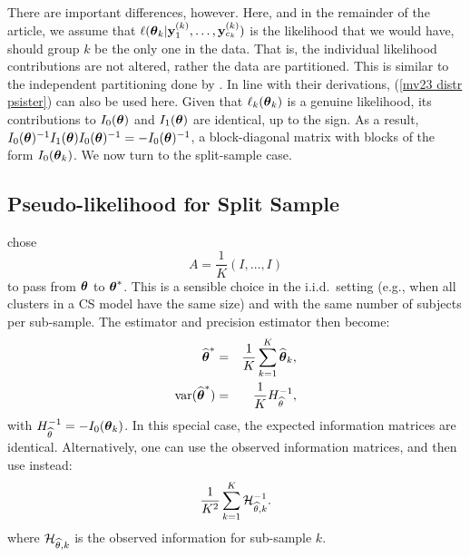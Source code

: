 \documentclass[11pt,a5paper,twoside]{book}
\newcommand{\bftheta}{\mbox{\boldmath $\theta$}}
\newcommand{\by}{{\bf y}}
\begin{document}
{\begin{sloppypar}
There are important differences, however. Here, and in the remainder 
of the article, we assume that
$\ell(\bftheta_k|\by_1^{(k)},\dots,\by_{c_k}^{(k)})$ is the likelihood 
that we would have, should group $k$ be the only one in the data. 
That is, the individual likelihood contributions are not altered, 
rather the data are partitioned. This is similar to the independent 
partitioning done by \cite{Iddi2011}. In line with their derivations, 
(\ref{mv23 distr psister}) can also be used here. Given that 
$\ell_k(\bftheta_k)$ is a genuine likelihood, its contributions 
to $I_0(\bftheta)$ and $I_1(\bftheta)$ are identical, up to the sign. 
As a result, $I_0(\bftheta)^{-1}I_1(\bftheta)I_0(\bftheta)^{-1}=-I_0(\bftheta)^{-1}$, 
a block-diagonal matrix with blocks of the form $I_0(\bftheta_k)$. We now turn to the split-sample case.
\end{sloppypar}



\subsection{Pseudo-likelihood for Split Sample }
\label{appC}


{\cite{Iddi2011}  chose
\begin{equation}
\label{amtrix}
A=\frac{1}{K}(I,\dots,I)
\end{equation}
to pass from $\bftheta$ to $\bftheta^\ast$. This is a sensible choice in the 
i.i.d.\ setting (e.g., when all clusters in a CS model have the same size) 
and with the same number of subjects per sub-sample. The estimator and 
precision estimator then become:
\begin{eqnarray}
\label{schatterindep}
\widehat{\bftheta}^*&=&\frac{1}{K}\sum_{k=1}^K\widehat{\bftheta}_k,\\
\label{asymptoticvarianceexpected}
\mbox{var}(\widehat{\bftheta}^*)&=&\frac{1}{K}H_{\widehat{\theta}}^{-1},
\end{eqnarray}
with $H_{\widehat{\theta}}^{-1}=-I_0(\bftheta_k)$. In this special case, 
the expected information matrices are identical. Alternatively, 
one can use the observed information matrices, and then use instead:
\begin{equation}
\label{asymptoticvarianceobserved}
\frac{1}{K^2}\sum_{k=1}^K{\cal H}_{\widehat{\theta}, k}^{-1}.
\end{equation}
where ${\cal H}_{\widehat{\theta}, k}$ is the observed 
information for sub-sample $k$.

}}
\end{document}
